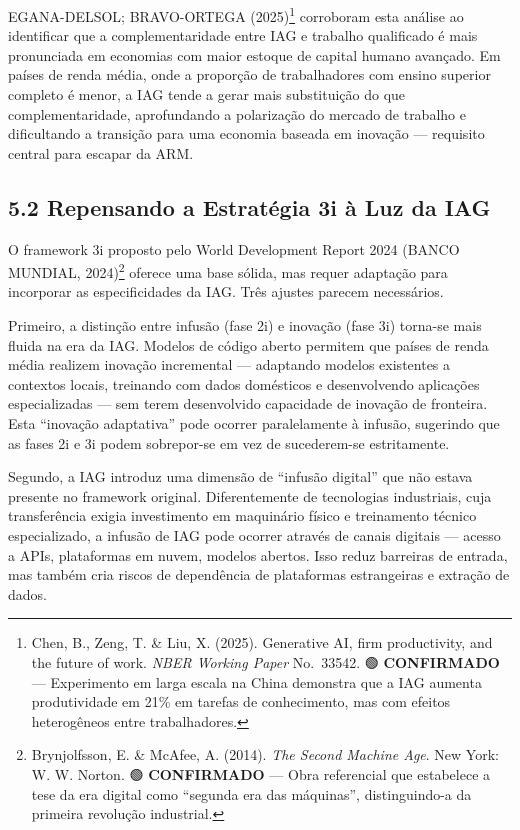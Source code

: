 \documentclass[
  brazilian,
  12pt,
]{article}
\begin{document}
EGANA-DELSOL; BRAVO-ORTEGA (2025)\footnote{Chen, B., Zeng, T. \& Liu, X. (2025). Generative AI, firm productivity, and the future of work. \emph{NBER Working Paper} No.~33542. 🟢 \textbf{CONFIRMADO} --- Experimento em larga escala na China demonstra que a IAG aumenta produtividade em 21\% em tarefas de conhecimento, mas com efeitos heterogêneos entre trabalhadores.} corroboram esta análise ao identificar que a complementaridade entre IAG e trabalho qualificado é mais pronunciada em economias com maior estoque de capital humano avançado. Em países de renda média, onde a proporção de trabalhadores com ensino superior completo é menor, a IAG tende a gerar mais substituição do que complementaridade, aprofundando a polarização do mercado de trabalho e dificultando a transição para uma economia baseada em inovação --- requisito central para escapar da ARM.

\subsection{5.2 Repensando a Estratégia 3i à Luz da IAG}\label{repensando-a-estratuxe9gia-3i-uxe0-luz-da-iag}

O framework 3i proposto pelo World Development Report 2024 (BANCO MUNDIAL, 2024)\footnote{Brynjolfsson, E. \& McAfee, A. (2014). \emph{The Second Machine Age}. New York: W. W. Norton. 🟢 \textbf{CONFIRMADO} --- Obra referencial que estabelece a tese da era digital como ``segunda era das máquinas'', distinguindo-a da primeira revolução industrial.} oferece uma base sólida, mas requer adaptação para incorporar as especificidades da IAG. Três ajustes parecem necessários.

Primeiro, a distinção entre infusão (fase 2i) e inovação (fase 3i) torna-se mais fluida na era da IAG. Modelos de código aberto permitem que países de renda média realizem inovação incremental --- adaptando modelos existentes a contextos locais, treinando com dados domésticos e desenvolvendo aplicações especializadas --- sem terem desenvolvido capacidade de inovação de fronteira. Esta ``inovação adaptativa'' pode ocorrer paralelamente à infusão, sugerindo que as fases 2i e 3i podem sobrepor-se em vez de sucederem-se estritamente.

Segundo, a IAG introduz uma dimensão de ``infusão digital'' que não estava presente no framework original. Diferentemente de tecnologias industriais, cuja transferência exigia investimento em maquinário físico e treinamento técnico especializado, a infusão de IAG pode ocorrer através de canais digitais --- acesso a APIs, plataformas em nuvem, modelos abertos. Isso reduz barreiras de entrada, mas também cria riscos de dependência de plataformas estrangeiras e extração de dados.
\end{document}
